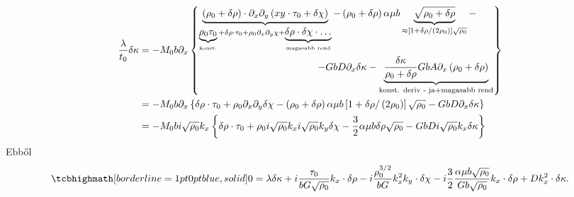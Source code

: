 \documentclass[10pt,a4paper]{scrartcl}
\begin{document}
\[\begin{aligned}
  \frac{\lambda }{{{t_0}}}\delta\kappa  &  =  - {M_0}b{\partial _x}\left\{ \begin{gathered}
  \underbrace {\left( {{\rho _0} + \delta \rho } \right) \cdot {\partial _x}{\partial _y}\left( {xy \cdot {\tau _0} + \delta \chi } \right)}_{\underbrace {{\rho _0}{\tau _0}}_{{\text{konst}}{\text{.}}} + \delta \rho  \cdot {\tau _0} + {\rho _0}{\partial _x}{\partial _y}\chi  + \underbrace {\delta \rho  \cdot \delta \chi  \cdot  \ldots }_{{\text{magasabb rend}}}} - \left( {{\rho _0} + \delta \rho } \right)\alpha \mu b\underbrace {\sqrt {{\rho _0} + \delta \rho } }_{ \approx \left[ {1 + \delta \rho /\left( {2{\rho _0}} \right)} \right]\sqrt {{\rho _0}} } -  \hfill \\
  \quad \quad \quad \quad \quad \quad \quad \quad \quad \quad \quad \quad  - GbD{\partial _x}\delta\kappa  - \underbrace {\frac{{\delta \kappa }}{{{\rho _0} + \delta \rho }}GbA{\partial _x}\left( {{\rho _0} + \delta \rho } \right)}_{{\text{konst}}{\text{. deriv - ja}} + {\text{magasabb rend}}} \hfill \\ 
\end{gathered}  \right\} \\ 
   &  =  - {M_0}b{\partial _x}\left\{ {\delta \rho  \cdot {\tau _0} + {\rho _0}{\partial _x}{\partial _y}\delta \chi  - \left( {{\rho _0} + \delta \rho } \right)\alpha \mu b\left[ {1 + \delta \rho /\left( {2{\rho _0}} \right)} \right]\sqrt {{\rho _0}}  - GbD{\partial _x}\delta\kappa } \right\} \\ 
   &  =  - {M_0}bi\sqrt {{\rho _0}} {k_x}\left\{ {\delta \rho  \cdot {\tau _0} + {\rho _0}i\sqrt {{\rho _0}} {k_x}i\sqrt {{\rho _0}} {k_y}\delta \chi  - \frac{3}{2}\alpha \mu b\delta \rho \sqrt {{\rho _0}}  - GbDi\sqrt {{\rho _0}} {k_x}\delta\kappa } \right\} \\ 
\end{aligned} \]
Ebből
\begin{equation} \label{eq:lin_ed_kappa}
\tcbhighmath[borderline={1pt}{0pt}{blue,solid}]{
0 = \lambda \delta\kappa  + i\frac{{{\tau _0}}}{{bG\sqrt {{\rho _0}} }}{k_x} \cdot \delta \rho  - i\frac{{\rho _0^{3/2}}}{{bG}}k_x^2{k_y} \cdot \delta \chi  - i\frac{3}{2}\frac{{\alpha \mu b\sqrt {{\rho _0}} }}{{Gb\sqrt {{\rho _0}} }}{k_x} \cdot \delta \rho  + Dk_x^2 \cdot \delta \kappa.}
\end{equation}
\end{document}
